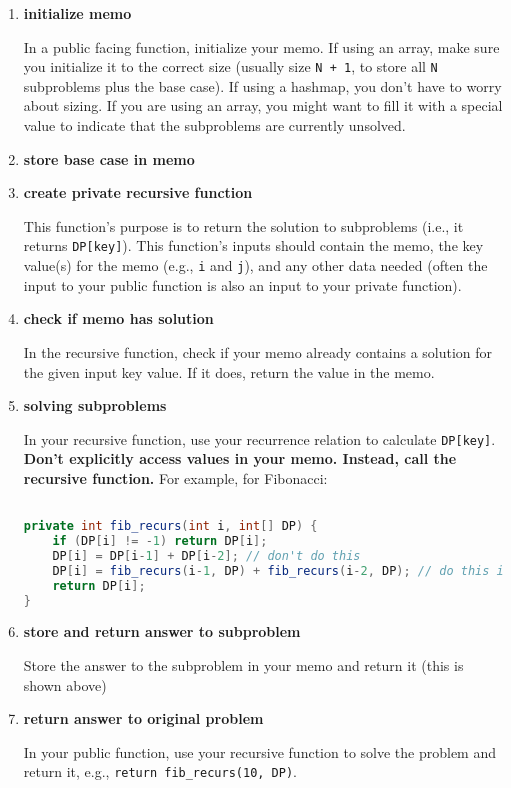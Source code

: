 \documentclass{article}
\begin{document}
\begin{enumerate}

    \item \textbf{initialize memo}
    
In a public facing function, initialize your memo. If using an array, make sure you initialize it to the correct size (usually size \texttt{N + 1}, to store all \texttt{N} subproblems plus the base case). If using a hashmap, you don't have to worry about sizing. If you are using an array, you might want to fill it with a special value to indicate that the subproblems are currently unsolved.

    \item \textbf{store base case in memo}
    
    \item \textbf{create private recursive function}

This function's purpose is to return the solution to subproblems (i.e., it returns \texttt{DP[key]}). This function's inputs should contain the memo, the key value(s) for the memo (e.g., \texttt{i} and \texttt{j}), and any other data needed (often the input to your public function is also an input to your private function).
    
    \item \textbf{check if memo has solution}

In the recursive function, check if your memo already contains a solution for the given input key value. If it does, return the value in the memo.
    
    \item \textbf{solving subproblems}
    
In your recursive function, use your recurrence relation to calculate \texttt{DP[key]}. \textbf{Don't explicitly access values in your memo. Instead, call the recursive function.} For example, for Fibonacci:

\begin{lstlisting}[language=Java]

private int fib_recurs(int i, int[] DP) {
    if (DP[i] != -1) return DP[i];
    DP[i] = DP[i-1] + DP[i-2]; // don't do this
    DP[i] = fib_recurs(i-1, DP) + fib_recurs(i-2, DP); // do this instead
    return DP[i];
}

\end{lstlisting}

    \item \textbf{store and return answer to subproblem}
 
Store the answer to the subproblem in your memo and return it (this is shown above)

    \item \textbf{return answer to original problem}
    
    In your public function, use your recursive function to solve the problem and return it, e.g., \texttt{return fib\_recurs(10, DP)}.
    
\end{enumerate}
\end{document}
